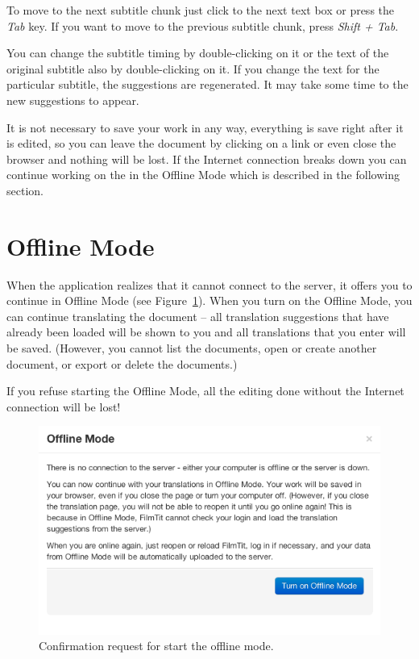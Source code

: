 To move to the next subtitle chunk just click to the next text box or press the \emph{Tab} key. If you want to move to the previous subtitle chunk, press \emph{Shift + Tab}.

You can change the subtitle timing by double-clicking on it or the text of the original subtitle also by double-clicking on it. If you change the text for the particular subtitle, the suggestions are regenerated. It may take some time to the new suggestions to appear.

It is not necessary to save your work in any way, everything is save right after it is edited, so you can leave the document by clicking on a link or even close the browser and nothing will be lost. If the Internet connection breaks down you can continue working on the in the Offline Mode which is described in the following section.

\section{Offline Mode}
\label{um:sec:offlinemode}

When the application realizes that it cannot connect to the server, it offers you to continue in Offline Mode (see Figure~\ref{fig:start_offline_mode}). When you turn on the Offline Mode, you can continue translating the document -- all translation suggestions that have already been loaded will be shown to you and all translations that you enter will be saved.
(However, you cannot list the documents, open or create another document, or export or delete the documents.)

If you refuse starting the Offline Mode, all the editing done without the Internet connection will be lost!

\begin{figure}[h]
\begin{center}
\includegraphics[scale=0.4]{figures/user_manual/offline_mode.png}
\end{center}
\caption{Confirmation request for start the offline mode.}
\label{fig:start_offline_mode}
\end{figure}


